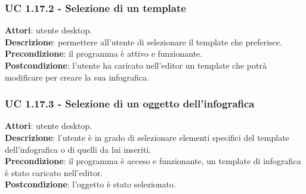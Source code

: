 \subsubsection{UC 1.17.2 - Selezione di un template}{
	\label{uc1.17.2}
	\textbf{Attori}: utente desktop. \\
	\textbf{Descrizione}: permettere all'utente di selezionare il template che preferisce. \\
	\textbf{Precondizione}: il programma è attivo e funzionante.\\
	\textbf{Postcondizione}: l'utente ha caricato nell'editor un template che potrà modificare per creare la sua infografica.	\\
	}
\subsubsection{UC 1.17.3 - Selezione di un oggetto dell'infografica}{
	\label{uc1.17.3}
	\textbf{Attori}: utente desktop. \\
	\textbf{Descrizione}: l'utente è in grado di selezionare elementi specifici del template dell'infografica o di quelli da lui inseriti. \\
	\textbf{Precondizione}: il programma è acceso e funzionante, un template di infografica è stato caricato nell'editor.	\\
	\textbf{Postcondizione}: l'oggetto è stato selezionato.	\\
	}
